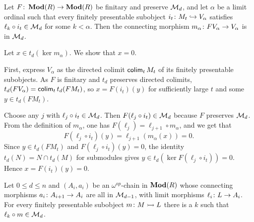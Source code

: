 \documentclass[runningheads]{llncs}
\begin{document}
\begin{lemmaE}
\label{prop:mdalpha}
Let $F \colon \operatorname{\mathbf{Mod}}(R) \to \operatorname{\mathbf{Mod}}(R)$ be finitary and preserve $\mathcal{M}_d$, and let $\alpha$ be a limit ordinal such that every finitely presentable subobject $i_t \colon M_t \hookrightarrow V_\alpha$ satisfies $\ell_k \circ i_t \in \mathcal{M}_d$ for some $k < \alpha$. 
Then the connecting morphism $m_\alpha \colon FV_\alpha \to V_\alpha$ is in $\mathcal{M}_d$.
\end{lemmaE}
\begin{proofE}
Let $x\in t_d(\ker m_\alpha)$. We show that $x=0$.

First, express $V_\alpha$ as the directed colimit  $\operatorname{\mathsf{colim}}_t M_t$ of its finitely presentable subobjects.
 As $F$ is finitary and $t_d$ preserves directed colimits, $t_d(FV_\alpha)=\operatorname{\mathsf{colim}}_t t_d(FM_t)$, so $x=F(i_t)(y)$ for sufficiently large $t$ and some $y\in t_d(FM_t)$.
 
Choose any $j$ with $\ell_j \circ i_t \in \mathcal{M}_d$.
Then $F(\ell_j\circ i_t) \in \mathcal{M}_d$ because $F$ preserves $\mathcal{M}_d$. From the definition of $m_\alpha$, one has $F (\ell_j )= \ell_{j+1}\circ m_\alpha$, and we get that
\begin{equation*}
 F(\ell_j\circ i_t)(y) =  \ell_{j+1}\left(m_\alpha(x)\right) = 0 .
\end{equation*}
Since $y\in t_d(FM_t)$ and $F(\ell_j\circ i_t)(y)=0$, the identity $t_d(N)=N\cap t_d(M)$ for submodules gives $y\in t_d(\ker F(\ell_j\circ i_t))=0$. Hence $x=F(i_t)(y)=0$.
\end{proofE} 
\begin{lemmaE}
\label{lem:mdchain}
Let $0\leq d \leq n$ and $(A_i, a_i)$ be an $\omega^{op}$-chain in $\operatorname{\mathbf{Mod}}(R)$ whose connecting morphisms $a_i \colon A_{i+1} \to A_i$ are all in $\mathcal{M}_{d-1}$, with limit morphisms $\ell_i \colon L \to A_i$. 
For every finitely presentable subobject $m \colon M \rightarrowtail L$ there is a $k$ such that $\ell_k\circ m \in \mathcal{M}_d$.
\end{lemmaE}
\end{document}
